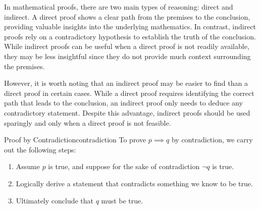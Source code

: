 In mathematical proofs, there are two main types of reasoning: direct and indirect. A direct proof shows a clear path from the premises to the conclusion, providing valuable insights into the underlying mathematics. In contrast, indirect proofs rely on a contradictory hypothesis to establish the truth of the conclusion. While indirect proofs can be useful when a direct proof is not readily available, they may be less insightful since they do not provide much context surrounding the premises.

However, it is worth noting that an indirect proof may be easier to find than a direct proof in certain cases. While a direct proof requires identifying the correct path that leads to the conclusion, an indirect proof only needs to deduce any contradictory statement. Despite this advantage, indirect proofs should be used sparingly and only when a direct proof is not feasible.




\begin{tecbox}{Proof by Contradiction}{contradiction}
    To prove $p \implies q$ by contradiction, we carry out the following steps:
    \begin{enumerate}
        \item Assume $p$ is true, and suppose for the sake of contradiction $\neg q$ is true.
        \item Logically derive a statement that contradicts something we know to be true.
        \item Ultimately conclude that $q$ must be true.
    \end{enumerate}
\end{tecbox}

